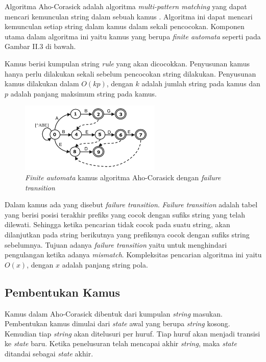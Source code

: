     Algoritma Aho-Corasick adalah algoritma \emph{multi-pattern matching} yang dapat mencari kemunculan string dalam sebuah kamus \citep{ahoc1975}. Algoritma ini dapat mencari kemunculan setiap string dalam kamus dalam sekali pencocokan. Komponen utama dalam algoritma ini yaitu kamus yang berupa \emph{finite automata} seperti pada Gambar II.3 di bawah. %

    Kamus berisi kumpulan string \emph{rule} yang akan dicocokkan. Penyusunan kamus hanya perlu dilakukan sekali sebelum pencocokan string dilakukan. Penyusunan kamus dilakukan dalam $O(kp)$, dengan $k$ adalah jumlah string pada kamus dan $p$ adalah panjang maksimum string pada kamus.

    \begin{figure}[htb]
      \centering
      \includegraphics[width=0.6\textwidth]{resources/aho-c.png}
      \caption[\emph{Finite automata} kamus algoritma Aho-Corasick dengan \emph{failure transition}]{\emph{Finite automata} kamus algoritma Aho-Corasick dengan \emph{failure transition} \citep{lin2013}}
    \end{figure}


    Dalam kamus ada yang disebut \emph{failure transition}. \emph{Failure transition} adalah tabel yang berisi posisi terakhir prefiks yang cocok dengan sufiks string yang telah dilewati. Sehingga ketika pencarian tidak cocok pada suatu string, akan dilanjutkan pada string berikutnya yang prefiksnya cocok dengan sufiks string sebelumnya. Tujuan adanya \emph{failure transition} yaitu untuk menghindari pengulangan ketika adanya \emph{mismatch}. Kompleksitas pencarian algoritma ini yaitu $O(x)$, dengan $x$ adalah panjang string pola.

  \subsection {Pembentukan Kamus}

    Kamus dalam Aho-Corasick dibentuk dari kumpulan \emph{string} masukan. Pembentukan kamus dimulai dari \emph{state} awal yang berupa \emph{string} kosong. Kemudian tiap \emph{string} akan ditelusuri per huruf. Tiap huruf akan menjadi transisi ke \emph{state} baru. Ketika penelusuran telah mencapai akhir \emph{string}, maka \emph{state} ditandai sebagai \emph{state} akhir.

